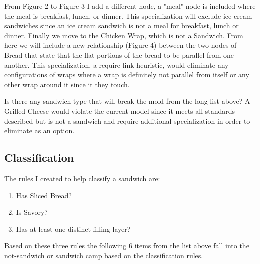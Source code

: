 \documentclass[
	letterpaper, %
]{jdf}
\begin{document}
From Figure 2 to Figure 3 I add a different node, a "meal" node is included where the meal is breakfast, lunch, or dinner. This specialization will exclude ice cream sandwiches since an ice cream sandwich is not a meal for breakfast, lunch or dinner. Finally we move to the Chicken Wrap, which is not a Sandwich. From here we will include a new relationship (Figure 4) between the two nodes of Bread that state that the flat portions of the bread to be parallel from one another. This specialization, a require link heuristic, would eliminate any configurations of wraps where a wrap is definitely not parallel from itself or any other wrap around it since it they touch.

Is there any sandwich type that will break the mold from the long list above? A Grilled Cheese would violate the current model since it meets all standards described but is not a sandwich and require additional specialization in order to eliminate as an option.
\subsection{Classification}
The rules I created to help classify a sandwich are:
\begin{enumerate}
    \item Has Sliced Bread?
    \item Is Savory?
    \item Has at least one distinct filling layer?
\end{enumerate}

Based on these three rules the following 6 items from the list above fall into the not-sandwich or sandwich camp based on the classification rules.
\end{document}
